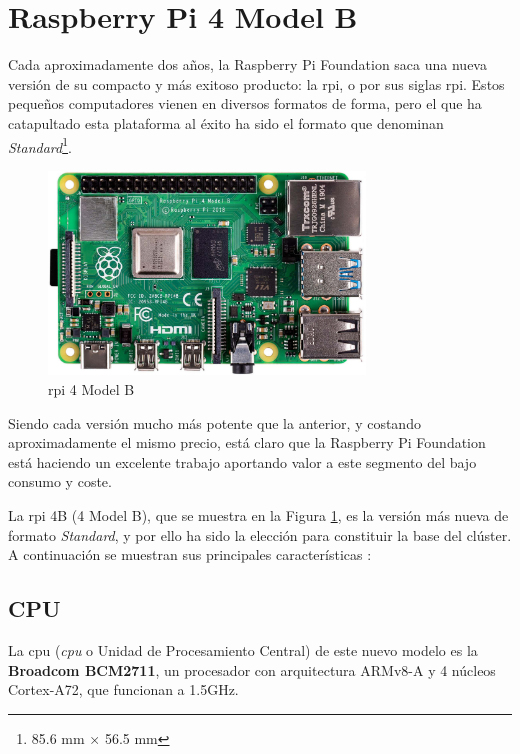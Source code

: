 \section{Raspberry Pi 4 Model B}
\label{sec:raspberry_pi_4_model_b}
Cada aproximadamente dos años, la Raspberry Pi Foundation saca una nueva versión de su compacto y más exitoso producto: la \acrlong{rpi}, o por sus siglas \acrshort{rpi}. Estos pequeños computadores vienen en diversos formatos de forma, pero el que ha catapultado esta plataforma al éxito ha sido el formato que denominan \textit{Standard}\footnote{85.6 mm × 56.5 mm}.

\begin{figure}[h!]
  \centering
  \includegraphics[width=0.75\textwidth]{img/rpi_parts/rpi_base.jpg}
  \caption{\acrlong{rpi} 4 Model B}
  \label{fig:rpi_base}
\end{figure}

Siendo cada versión mucho más potente que la anterior, y costando aproximadamente el mismo precio, está claro que la Raspberry Pi Foundation está haciendo un excelente trabajo aportando valor a este segmento del bajo consumo y coste.

La \acrlong{rpi} 4B (4 Model B), que se muestra en la Figura \ref{fig:rpi_base}, es la versión más nueva de formato \textit{Standard}, y por ello ha sido la elección para constituir la base del clúster. A continuación se muestran sus principales características \cite{rpi4b_specifications}:

\subsection{CPU}
La \acrshort{cpu} (\textit{\acrlong{cpu}} o Unidad de Procesamiento Central) de este nuevo modelo es la \textbf{Broadcom BCM2711}, un procesador con arquitectura ARMv8-A y 4 núcleos Cortex-A72, que funcionan a 1.5GHz.

